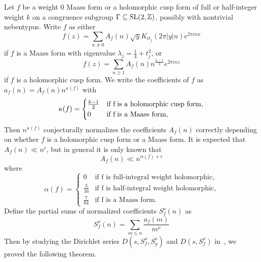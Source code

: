 Let $f$ be a weight $0$ Maass form or a holomorphic cusp form of full or half-integer
weight $k$ on a congruence subgroup $\Gamma \subseteq \operatorname{SL}(2, \mathbb{Z})$, possibly with
nontrivial nebentypus.
Write $f$ as either
\begin{equation}
  f(z) = \sum_{n \neq 0} A_f(n) \sqrt{y} K_{it_j} (2\pi \lvert y \rvert n) e^{2\pi i n x}
\end{equation}
if $f$ is a Maass form with eigenvalue $\lambda_j = \frac{1}{4} + t_j^2$, or
\begin{equation}
  f(z) = \sum_{n \geq 1} A_f(n)n^{\frac{k-1}{2}} e^{2 \pi i n z}
\end{equation}
if $f$ is a holomorphic cusp form.
We write the coefficients of $f$ as $a_f(n) = A_f(n)n^{\kappa(f)}$ with
\begin{equation}
  \kappa(f) = \begin{cases}
    \frac{k-1}{2} & \text{if } $f$ \; \text{is a holomorphic cusp form}, \\
    0 & \text{if } $f$ \; \text{is a Maass form},
  \end{cases}
\end{equation}
Then $n^{\kappa(f)}$ conjecturally normalizes the coefficients $A_f(n)$ correctly
depending on whether $f$ is a holomorphic cusp form or a Maass form.
It is expected that $A_f(n) \ll n^\epsilon$, but in general it is only known that
\begin{equation}
  A_f(n) \ll n^{\alpha(f) + \epsilon}
\end{equation}
where
\begin{equation}
  \alpha(f) = \begin{cases}
    0 & \text{if f is full-integral weight holomorphic}, \\
    \frac{3}{16} & \text{if f is half-integral weight holomorphic}, \\
    \frac{7}{64} & \text{if f is a Maass form}.
  \end{cases}
\end{equation}
Define the partial sums of normalized coefficients $S_f^\nu(n)$ as
\begin{equation}
  S_f^\nu(n) = \sum_{m \leq n} \frac{a_f(m)}{m^\nu}
\end{equation}
Then by studying the Dirichlet series $D(s, S_f^\nu, \overline{S_g^\nu})$ and $D(s,
S_f^\nu)$ in~\cite{hkldwSigns}, we proved the following theorem.


